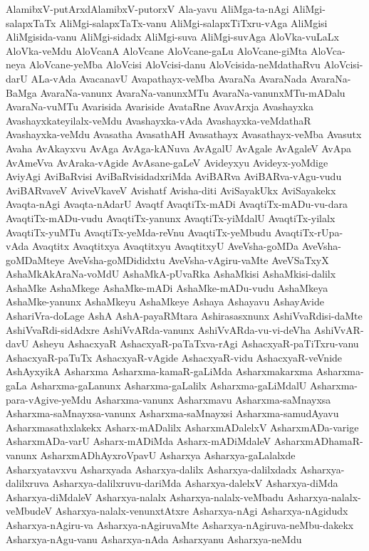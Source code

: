 {AlamibxV-putArxdAlamibxV-putorxV
Ala-yavu
AliMga-ta-nAgi
AliMgi-salapxTaTx
AliMgi-salapxTaTx-vanu
AliMgi-salapxTiTxru-vAga
AliMgisi
AliMgisida-vanu
AliMgi-sidadx
AliMgi-suva
AliMgi-suvAga
AloVka-vuLaLx
AloVka-veMdu
AloVcanA
AloVcane
AloVcane-gaLu
AloVcane-giMta
AloVca-neya
AloVcane-yeMba
AloVcisi
AloVcisi-danu
AloVcisida-neMdathaRvu
AloVcisi-darU
ALa-vAda
AvacanavU
Avapathayx-veMba
AvaraNa
AvaraNada
AvaraNa-BaMga
AvaraNa-vanunx
AvaraNa-vanunxMTu
AvaraNa-vanunxMTu-mADalu
AvaraNa-vuMTu
Avarisida
Avariside
AvataRne
AvavArxja
Avashayxka
Avashayxkateyilalx-veMdu
Avashayxka-vAda
Avashayxka-veMdathaR
Avashayxka-veMdu
Avasatha
AvasathAH
Avasathayx
Avasathayx-veMba
Avasutx
Avaha
AvAkayxvu
AvAga
AvAga-kANuva
AvAgalU
AvAgale
AvAgaleV
AvApa
AvAmeVva
AvAraka-vAgide
AvAsane-gaLeV
Avideyxyu
Avideyx-yoMdige
AviyAgi
AviBaRvisi
AviBaRvisidadxriMda
AviBARva
AviBARva-vAgu-vudu
AviBARvaveV
AviveVkaveV
Avishatf
Avisha-diti
AviSayakUkx
AviSayakekx
Avaqta-nAgi
Avaqta-nAdarU
Avaqtf
AvaqtiTx-mADi
AvaqtiTx-mADu-vu-dara
AvaqtiTx-mADu-vudu
AvaqtiTx-yanunx
AvaqtiTx-yiMdalU
AvaqtiTx-yilalx
AvaqtiTx-yuMTu
AvaqtiTx-yeMda-reVnu
AvaqtiTx-yeMbudu
AvaqtiTx-rUpa-vAda
Avaqtitx
Avaqtitxya
Avaqtitxyu
AvaqtitxyU
AveVsha-goMDa
AveVsha-goMDaMteye
AveVsha-goMDididxtu
AveVsha-vAgiru-vaMte
AveVSaTxyX
AshaMkAkAraNa-voMdU
AshaMkA-pUvaRka
AshaMkisi
AshaMkisi-dalilx
AshaMke
AshaMkege
AshaMke-mADi
AshaMke-mADu-vudu
AshaMkeya
AshaMke-yanunx
AshaMkeyu
AshaMkeye
Ashaya
Ashayavu
AshayAvide
AshariVra-doLage
AshA
AshA-payaRMtara
Ashirasasxnunx
AshiVvaRdisi-daMte
AshiVvaRdi-sidAdxre
AshiVvARda-vanunx
AshiVvARda-vu-vi-deVha
AshiVvAR-davU
Asheyu
AshacxyaR
AshacxyaR-paTaTxva-rAgi
AshacxyaR-paTiTxru-vanu
AshacxyaR-paTuTx
AshacxyaR-vAgide
AshacxyaR-vidu
AshacxyaR-veVnide
AshAyxyikA
Asharxma
Asharxma-kamaR-gaLiMda
Asharxmakarxma
Asharxma-gaLa
Asharxma-gaLanunx
Asharxma-gaLalilx
Asharxma-gaLiMdalU
Asharxma-para-vAgive-yeMdu
Asharxma-vanunx
Asharxmavu
Asharxma-saMnayxsa
Asharxma-saMnayxsa-vanunx
Asharxma-saMnayxsi
Asharxma-samudAyavu
Asharxmasathxlakekx
Asharx-mADalilx
AsharxmADalelxV
AsharxmADa-varige
AsharxmADa-varU
Asharx-mADiMda
Asharx-mADiMdaleV
AsharxmADhamaR-vanunx
AsharxmADhAyxroVpavU
Asharxya
Asharxya-gaLalalxde
Asharxyatavxvu
Asharxyada
Asharxya-dalilx
Asharxya-dalilxdadx
Asharxya-dalilxruva
Asharxya-dalilxruvu-dariMda
Asharxya-dalelxV
Asharxya-diMda
Asharxya-diMdaleV
Asharxya-nalalx
Asharxya-nalalx-veMbadu
Asharxya-nalalx-veMbudeV
Asharxya-nalalx-venunxtAtxre
Asharxya-nAgi
Asharxya-nAgidudx
Asharxya-nAgiru-va
Asharxya-nAgiruvaMte
Asharxya-nAgiruva-neMbu-dakekx
Asharxya-nAgu-vanu
Asharxya-nAda
Asharxyanu
Asharxya-neMdu
}
